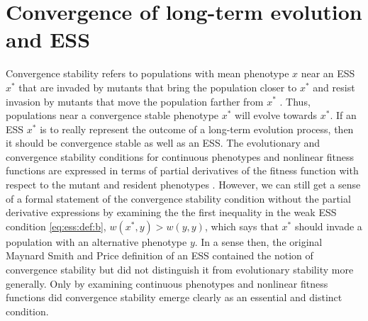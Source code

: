 \documentclass[11pt]{article}
\newcommand{\w}{w}
\newcommand{\ess}[1]{#1^*}
\begin{document}
\section{Convergence of long-term evolution and ESS}

Convergence stability refers to populations with mean phenotype $x$ near an ESS $\ess{x}$ that are invaded by mutants that bring the population closer to $\ess{x}$ and resist invasion by mutants that move the population farther from $\ess{x}$ \cite{Eshel:1983,Taylor:1989}. Thus, populations near a convergence stable phenotype $\ess{x}$ will evolve towards $\ess{x}$. If an ESS $\ess{x}$ is to really represent the outcome of a long-term evolution process, then it should be convergence stable as well as an ESS. The evolutionary and convergence stability conditions for continuous phenotypes and nonlinear fitness functions are expressed in terms of partial derivatives of the fitness function with respect to the mutant and resident phenotypes \cite{Eshel:1983,Taylor:1989,Geritz:Kisdi:1998}. However, we can still get a sense of a formal statement of the convergence stability condition without the partial derivative expressions by examining the the first inequality in the weak ESS condition \eqref{eq:ess:def:b}, $\w(\ess{x}, y) > \w(y, y)$, which says that $\ess{x}$ should invade a population with an alternative phenotype $y$. In a sense then, the original Maynard Smith and Price definition of an ESS \cite{Maynard-Smith:Price:1973,Maynard-Smith:1974} contained the notion of convergence stability but did not distinguish it from evolutionary stability more generally. Only by examining continuous phenotypes and nonlinear fitness functions did convergence stability emerge clearly as an essential and distinct condition.
\end{document}
